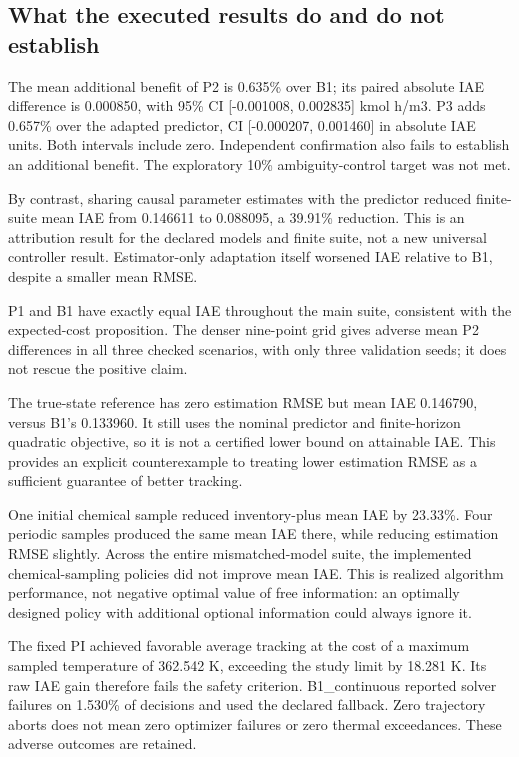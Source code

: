 \documentclass[
  11pt,
]{article}
\begin{document}
\endgroup

\hypertarget{what-the-executed-results-do-and-do-not-establish}{%
\subsection{What the executed results do and do not
establish}\label{what-the-executed-results-do-and-do-not-establish}}

The mean additional benefit of P2 is 0.635\% over B1; its paired
absolute IAE difference is 0.000850, with 95\% CI {[}-0.001008,
0.002835{]} kmol h/m3. P3 adds 0.657\% over the adapted predictor, CI
{[}-0.000207, 0.001460{]} in absolute IAE units. Both intervals include
zero. Independent confirmation also fails to establish an additional
benefit. The exploratory 10\% ambiguity-control target was not met.

By contrast, sharing causal parameter estimates with the predictor
reduced finite-suite mean IAE from 0.146611 to 0.088095, a 39.91\%
reduction. This is an attribution result for the declared models and
finite suite, not a new universal controller result. Estimator-only
adaptation itself worsened IAE relative to B1, despite a smaller mean
RMSE.

P1 and B1 have exactly equal IAE throughout the main suite, consistent
with the expected-cost proposition. The denser nine-point grid gives
adverse mean P2 differences in all three checked scenarios, with only
three validation seeds; it does not rescue the positive claim.

The true-state reference has zero estimation RMSE but mean IAE 0.146790,
versus B1's 0.133960. It still uses the nominal predictor and
finite-horizon quadratic objective, so it is not a certified lower bound
on attainable IAE. This provides an explicit counterexample to treating
lower estimation RMSE as a sufficient guarantee of better tracking.

One initial chemical sample reduced inventory-plus mean IAE by 23.33\%.
Four periodic samples produced the same mean IAE there, while reducing
estimation RMSE slightly. Across the entire mismatched-model suite, the
implemented chemical-sampling policies did not improve mean IAE. This is
realized algorithm performance, not negative optimal value of free
information: an optimally designed policy with additional optional
information could always ignore it.

The fixed PI achieved favorable average tracking at the cost of a
maximum sampled temperature of 362.542 K, exceeding the study limit by
18.281 K. Its raw IAE gain therefore fails the safety criterion.
B1\_continuous reported solver failures on 1.530\% of decisions and used
the declared fallback. Zero trajectory aborts does not mean zero
optimizer failures or zero thermal exceedances. These adverse outcomes
are retained.
\end{document}
